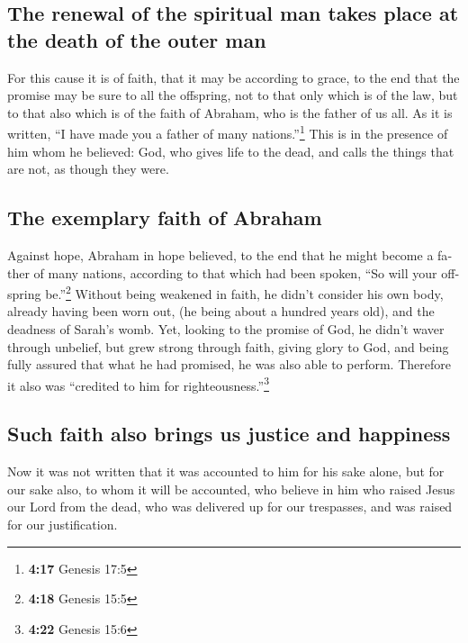 \begin{paracol}{2}
\begin{otherlanguage}{english}
\hypertarget{the-renewal-of-the-spiritual-man-takes-place-at-the-death-of-the-outer-man}{%
\subsection{The renewal of the spiritual man takes place at the death of
the outer
man}\label{the-renewal-of-the-spiritual-man-takes-place-at-the-death-of-the-outer-man}}

 For this cause it is of faith, that it may be according
to grace, to the end that the promise may be sure to all the offspring,
not to that only which is of the law, but to that also which is of the
faith of Abraham, who is the father of us all.  As it is
written, ``I have made you a father of many nations.''\footnote{\textbf{4:17}
  Genesis 17:5} This is in the presence of him whom he believed: God,
who gives life to the dead, and calls the things that are not, as though
they were.

\hypertarget{the-exemplary-faith-of-abraham}{%
\subsection{The exemplary faith of
Abraham}\label{the-exemplary-faith-of-abraham}}

 Against hope, Abraham in hope believed, to the end that
he might become a father of many nations, according to that which had
been spoken, ``So will your offspring be.''\footnote{\textbf{4:18}
  Genesis 15:5}  Without being weakened in faith, he
didn't consider his own body, already having been worn out, (he being
about a hundred years old), and the deadness of Sarah's womb.
 Yet, looking to the promise of God, he didn't waver
through unbelief, but grew strong through faith, giving glory to God,
 and being fully assured that what he had promised, he
was also able to perform.  Therefore it also was
``credited to him for righteousness.''\footnote{\textbf{4:22} Genesis
  15:6}

\hypertarget{such-faith-also-brings-us-justice-and-happiness}{%
\subsection{Such faith also brings us justice and
happiness}\label{such-faith-also-brings-us-justice-and-happiness}}

 Now it was not written that it was accounted to him for
his sake alone,  but for our sake also, to whom it will
be accounted, who believe in him who raised Jesus our Lord from the
dead,  who was delivered up for our trespasses, and was
raised for our justification.


\end{otherlanguage}
\end{paracol}
